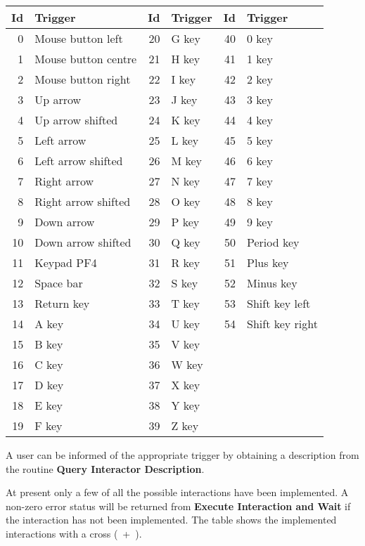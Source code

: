 \documentclass[11pt,nolof]{starlink}
\begin{document}
\begin{small}
\begin{center}
\begin{tabular}{|r|p{9em}||r|p{9em}||r|p{9em}|}
\hline
Id & Trigger & Id & Trigger & Id & Trigger \\
\hline
0 & Mouse button left   & 20 &  G key & 40 & 0 key \\
1 & Mouse button centre & 21 &  H key & 41 & 1 key \\
2 & Mouse button right  & 22 &  I key & 42 & 2 key \\
3 & Up arrow            & 23 &  J key & 43 & 3 key \\
4 & Up arrow shifted    & 24 &  K key & 44 & 4 key \\
5 & Left arrow          & 25 &  L key & 45 & 5 key \\
6 & Left arrow shifted  & 26 &  M key & 46 & 6 key \\
7 & Right arrow         & 27 &  N key & 47 & 7 key \\
8 & Right arrow shifted & 28 &  O key & 48 & 8 key \\
9 & Down arrow          & 29 &  P key & 49 & 9 key \\
10 & Down arrow shifted  & 30 & Q key & 50 & Period key \\
11 & Keypad PF4          & 31 & R key & 51 & Plus key \\
12 & Space bar           & 32 & S key & 52 & Minus key \\
13 & Return key          & 33 & T key & 53 & Shift key left \\
14 & A key               & 34 & U key & 54 & Shift key right \\
15 & B key               & 35 & V key & & \\
16 & C key               & 36 & W key & & \\
17 & D key               & 37 & X key & & \\
18 & E key               & 38 & Y key & & \\
19 & F key               & 39 & Z key & & \\
\hline
\end{tabular}
\end{center}
\end{small}

A user can be informed of the appropriate trigger by obtaining a description
from the routine \textbf{Query Interactor Description}.

At present only a few of all the possible interactions have been implemented.
A non-zero error status will be returned from \textbf{Execute Interaction and
Wait} if the interaction has not been implemented.
The table shows the implemented interactions with a cross (~+~).
\end{document}
